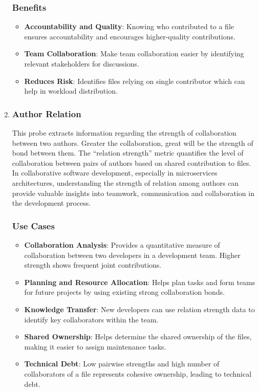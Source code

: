 \begin{enumerate}[leftmargin=*, label=\arabic*.]
	\subsubsection{Benefits}
	\begin{itemize}[label=$\bullet$]
		\item \textbf{Accountability and Quality}: Knowing who contributed to a file ensures accountability and encourages higher-quality contributions.
		\item \textbf{Team Collaboration}: Make team collaboration easier by identifying relevant stakeholders for discussions.
		\item \textbf{Reduces Risk}: Identifies files relying on single contributor which can help in workload distribution.
	\end{itemize} 

	\item \subsubsection*{Author Relation}
	This probe extracts information regarding the strength of collaboration between two authors. Greater the collaboration, great will be the strength of bond between them. The ``relation strength'' metric quantifies the level of collaboration between pairs of authors based on shared contribution to files. In collaborative software development, especially in microservices architectures, understanding the strength of relation among authors can provide valuable insights into teamwork, communication and collaboration in the development process.
	\subsubsection{Use Cases}
	\begin{itemize}[label=$\bullet$]
		\item \textbf{Collaboration Analysis}: Provides a quantitative measure of collaboration between two developers in a development team. Higher strength shows frequent joint contributions.
		\item \textbf{Planning and Resource Allocation}: Helps plan tasks and form teams for future projects by using existing strong collaboration bonds.
		\item \textbf{Knowledge Transfer}: New developers can use relation strength data to identify key collaborators within the team.
		\item \textbf{Shared Ownership}: Helps determine the shared ownership of the files, making it easier to assign maintenance tasks.
		\item \textbf{Technical Debt}: Low pairwise strengths and high number of collaborators of a file represents cohesive ownership, leading to technical debt.
	\end{itemize}

\end{enumerate}
